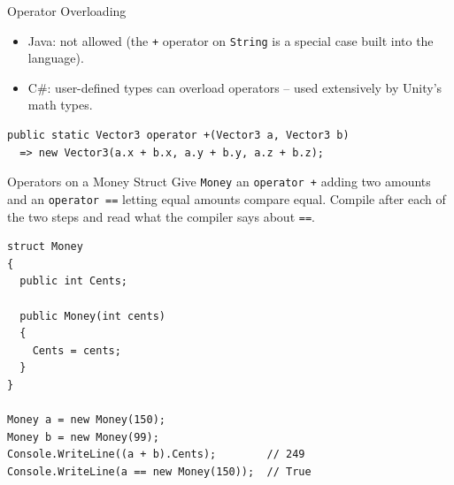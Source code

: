 \begin{frame}[fragile]{Operator Overloading}
  \begin{itemize}
    \item Java: not allowed (the \texttt{+} operator on \texttt{String}
      is a special case built into the language).
    \item C\#: user-defined types can overload operators -- used
      extensively by Unity's math types.
  \end{itemize}
  \begin{lstlisting}
public static Vector3 operator +(Vector3 a, Vector3 b)
  => new Vector3(a.x + b.x, a.y + b.y, a.z + b.z);
  \end{lstlisting}

  \vfill


\end{frame}

\begin{exerciseframe}{Operators on a Money Struct}
  Give \texttt{Money} an \texttt{operator +} adding two amounts and an
  \texttt{operator ==} letting equal amounts compare equal. Compile after each
  of the two steps and read what the compiler says about \texttt{==}.
  \vspace{1ex}

  \begin{lstlisting}[basicstyle=\scriptsize\ttfamily]
struct Money
{
  public int Cents;

  public Money(int cents)
  {
    Cents = cents;
  }
}

Money a = new Money(150);
Money b = new Money(99);
Console.WriteLine((a + b).Cents);        // 249
Console.WriteLine(a == new Money(150));  // True
  \end{lstlisting}
\end{exerciseframe}

